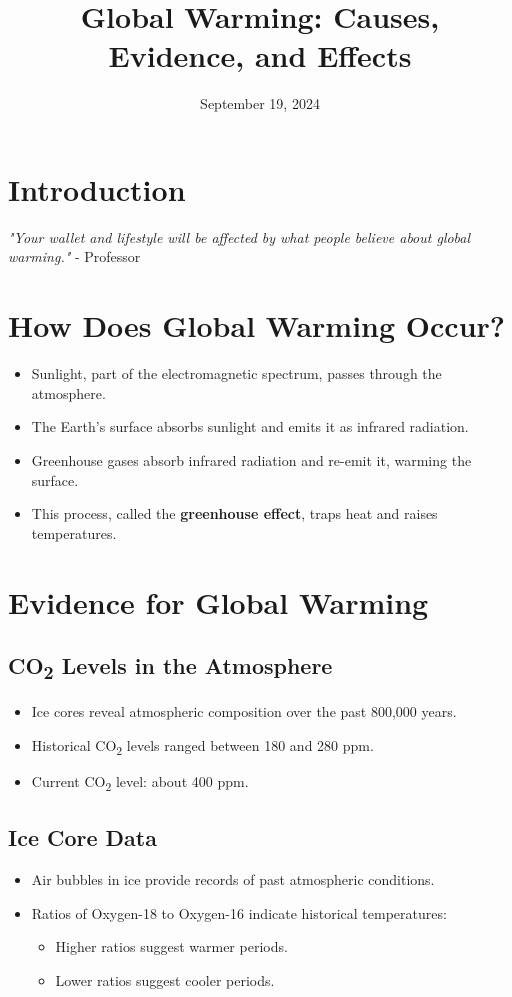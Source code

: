 \documentclass[12pt]{article}
\title{Global Warming: Causes, Evidence, and Effects}
\author{}
\date{September 19, 2024}
\begin{document}
\maketitle

\section*{Introduction}
\textit{"Your wallet and lifestyle will be affected by what people believe about global warming."} - Professor

\section*{How Does Global Warming Occur?}
\begin{itemize}
    \item Sunlight, part of the electromagnetic spectrum, passes through the atmosphere.
    \item The Earth's surface absorbs sunlight and emits it as infrared radiation.
    \item Greenhouse gases absorb infrared radiation and re-emit it, warming the surface.
    \item This process, called the \textbf{greenhouse effect}, traps heat and raises temperatures.
\end{itemize}

\section*{Evidence for Global Warming}
\subsection*{CO\textsubscript{2} Levels in the Atmosphere}
\begin{itemize}
    \item Ice cores reveal atmospheric composition over the past 800,000 years.
    \item Historical CO\textsubscript{2} levels ranged between 180 and 280 ppm.
    \item Current CO\textsubscript{2} level: about 400 ppm.
\end{itemize}

\subsection*{Ice Core Data}
\begin{itemize}
    \item Air bubbles in ice provide records of past atmospheric conditions.
    \item Ratios of Oxygen-18 to Oxygen-16 indicate historical temperatures:
    \begin{itemize}
        \item Higher ratios suggest warmer periods.
        \item Lower ratios suggest cooler periods.
    \end{itemize}
\end{itemize}
\end{document}
